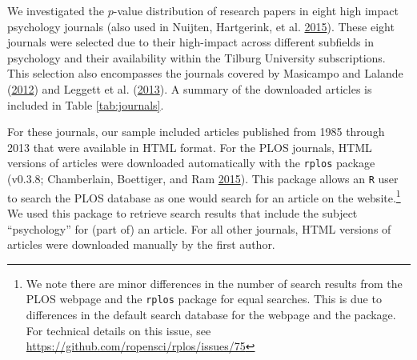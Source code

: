 \documentclass[a5paper]{book}
\let\rmarkdownfootnote\footnote%
\def\footnote{\protect\rmarkdownfootnote}
\begin{document}
We investigated the \(p\)-value distribution of research papers in eight
high impact psychology journals (also used in Nuijten, Hartgerink, et
al. \protect\hyperlink{ref-doi:10.3758ux2fs13428-015-0664-2}{2015}).
These eight journals were selected due to their high-impact across
different subfields in psychology and their availability within the
Tilburg University subscriptions. This selection also encompasses the
journals covered by Masicampo and Lalande
(\protect\hyperlink{ref-doi:10.1080ux2f17470218.2012.711335}{2012}) and
Leggett et al.
(\protect\hyperlink{ref-doi:10.1080ux2f17470218.2013.863371}{2013}). A
summary of the downloaded articles is included in Table
\ref{tab:journals}.

For these journals, our sample included articles published from 1985
through 2013 that were available in HTML format. For the PLOS journals,
HTML versions of articles were downloaded automatically with the
\texttt{rplos} package (v0.3.8; Chamberlain, Boettiger, and Ram
\protect\hyperlink{ref-Chamberlain2015-tg}{2015}). This package allows
an \texttt{R} user to search the PLOS database as one would search for
an article on the website.\footnote{We note there are minor differences
  in the number of search results from the PLOS webpage and the
  \texttt{rplos} package for equal searches. This is due to differences
  in the default search database for the webpage and the package. For
  technical details on this issue, see
  \url{https://github.com/ropensci/rplos/issues/75}} We used this
package to retrieve search results that include the subject
\enquote{psychology} for (part of) an article. For all other journals,
HTML versions of articles were downloaded manually by the first author.
\end{document}
